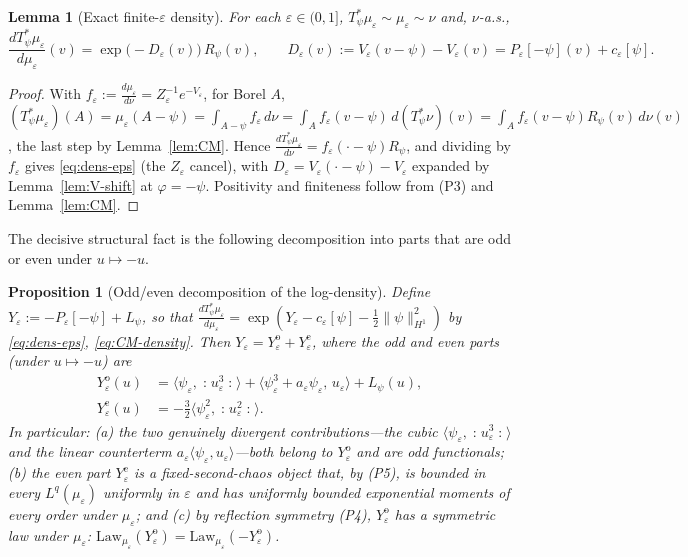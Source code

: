 \documentclass[12pt]{article}
\newcommand{\eps}{\varepsilon}
\newcommand{\Wick}[1]{\mathopen{:}#1\mathclose{:}}
\theoremstyle{plain}
\newtheorem{lemma}{Lemma}
\newtheorem{proposition}{Proposition}
\theoremstyle{definition}
\begin{document}
\begin{lemma}[Exact finite-$\eps$ density]\label{lem:density-eps}
For each $\eps\in(0,1]$, $T_\psi^*\mu_\eps\sim\mu_\eps\sim\nu$ and, $\nu$-a.s.,
\begin{equation}\label{eq:dens-eps}
\frac{dT_\psi^*\mu_\eps}{d\mu_\eps}(v)=\exp\!\big(-D_\eps(v)\big)\,R_\psi(v),
\qquad D_\eps(v):=V_\eps(v-\psi)-V_\eps(v)=P_\eps[-\psi](v)+c_\eps[\psi].
\end{equation}
\end{lemma}

\begin{proof}
With $f_\eps:=\tfrac{d\mu_\eps}{d\nu}=Z_\eps^{-1}e^{-V_\eps}$, for Borel $A$,
$(T_\psi^*\mu_\eps)(A)=\mu_\eps(A-\psi)=\int_{A-\psi}f_\eps\,d\nu
=\int_A f_\eps(v-\psi)\,d(T_\psi^*\nu)(v)=\int_A f_\eps(v-\psi)R_\psi(v)\,d\nu(v)$,
the last step by Lemma~\ref{lem:CM}. Hence $\tfrac{dT_\psi^*\mu_\eps}{d\nu}=f_\eps(\cdot-\psi)R_\psi$,
and dividing by $f_\eps$ gives \eqref{eq:dens-eps} (the $Z_\eps$ cancel), with
$D_\eps=V_\eps(\cdot-\psi)-V_\eps$ expanded by Lemma~\ref{lem:V-shift} at $\varphi=-\psi$.
Positivity and finiteness follow from (P3) and Lemma~\ref{lem:CM}.
\end{proof}

The decisive structural fact is the following decomposition into parts that are odd
or even under $u\mapsto-u$.

\begin{proposition}[Odd/even decomposition of the log-density]\label{prop:odd}
Define $Y_\eps:=-P_\eps[-\psi]+L_\psi$, so that
$\frac{dT_\psi^*\mu_\eps}{d\mu_\eps}=\exp(Y_\eps-c_\eps[\psi]-\tfrac12\|\psi\|_{H^1}^2)$
by \eqref{eq:dens-eps}, \eqref{eq:CM-density}. Then $Y_\eps=Y_\eps^{\mathrm{o}}+Y_\eps^{\mathrm{e}}$,
where the odd and even parts (under $u\mapsto-u$) are
\begin{align}
Y_\eps^{\mathrm{o}}(u)&=\langle\psi_\eps,\Wick{u_\eps^3}\rangle
+\langle\psi_\eps^3+a_\eps\psi_\eps,\,u_\eps\rangle+L_\psi(u),\label{eq:Yodd}\\
Y_\eps^{\mathrm{e}}(u)&=-\tfrac32\langle\psi_\eps^2,\Wick{u_\eps^2}\rangle .\label{eq:Yeven}
\end{align}
In particular: (a) the two genuinely divergent contributions---the cubic
$\langle\psi_\eps,\Wick{u_\eps^3}\rangle$ and the linear counterterm
$a_\eps\langle\psi_\eps,u_\eps\rangle$---both belong to $Y_\eps^{\mathrm{o}}$ and are
odd functionals; (b) the even part $Y_\eps^{\mathrm{e}}$ is a fixed-second-chaos
object that, by (P5), is bounded in every $L^q(\mu_\eps)$ uniformly in $\eps$ and has
uniformly bounded exponential moments of every order under $\mu_\eps$; and (c) by
reflection symmetry (P4), $Y_\eps^{\mathrm{o}}$ has a symmetric law under $\mu_\eps$:
$\mathrm{Law}_{\mu_\eps}(Y_\eps^{\mathrm{o}})=\mathrm{Law}_{\mu_\eps}(-Y_\eps^{\mathrm{o}})$.
\end{proposition}
\end{document}
